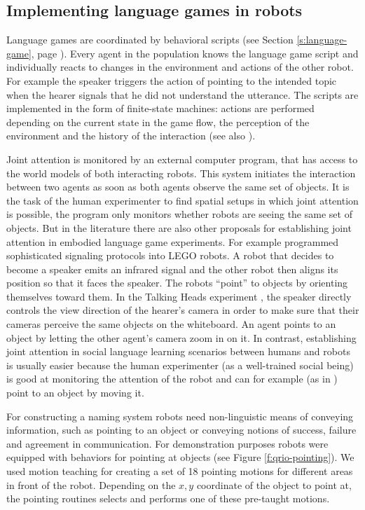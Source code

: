 \subsection{Implementing language games in robots}
\label{s:scaffolding-social-skills}

Language games are coordinated by behavioral scripts (see Section
\ref{s:language-game}, page \pageref{s:language-game}). Every agent in
the population knows the language game script and individually reacts
to changes in the environment and actions of the other robot. For
example the speaker triggers the action of pointing to the intended
topic when the hearer signals that he did not understand the
utterance. The scripts are implemented in the form of finite-state
machines: actions are performed depending on the current state in the
game flow, the perception of the environment and the history of the
interaction (see also \citealp*{loetzsch06xabsl}).

Joint attention is monitored by an external computer program, that has
access to the world models of both interacting robots.  This system
initiates the interaction between two agents as soon as both agents
observe the same set of objects.  It is the task of the human
experimenter to find spatial setups in which joint attention is
possible, the program only monitors whether robots are seeing the same
set of objects. But in the literature there are also other proposals
for establishing joint attention in embodied language game
experiments. For example \cite{steels97grounding} programmed
sophisticated signaling protocols into LEGO robots. A robot that
decides to become a speaker emits an infrared signal and the other
robot then aligns its position so that it faces the speaker. The
robots ``point'' to objects by orienting themselves toward them. In
the Talking Heads experiment \citep{steels98origins}, the speaker
directly controls the view direction of the hearer's camera in order
to make sure that their cameras perceive the same objects on the
whiteboard. An agent points to an object by letting the other agent's
camera zoom in on it. In contrast, establishing joint attention in
social language learning scenarios between humans and robots is
usually easier because the human experimenter (as a well-trained
social being) is good at monitoring the attention of the robot and can
for example (as in \citealp{dominey05learning}) point to an object by
moving it.


For constructing a naming system robots need non-linguistic means of
conveying information, such as pointing to an object or conveying
notions of success, failure and agreement in communication.  For
demonstration purposes robots were equipped with behaviors for
pointing at objects (see Figure \ref{f:qrio-pointing}). We used motion
teaching for creating a set of 18 pointing motions for different areas
in front of the robot. Depending on the $x,y$ coordinate of the object
to point at, the pointing routines selects and performs one of these
pre-taught motions. 


